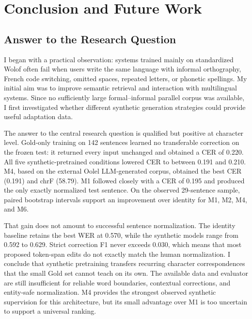 \documentclass[12pt, a4paper, twoside, openany]{report}
\begin{document}
\chapter{Conclusion and Future Work}
\label{chap:conclusion}

\section{Answer to the Research Question}

I began with a practical observation: systems trained mainly on standardized Wolof often fail when users write the same language with informal orthography, French code switching, omitted spaces, repeated letters, or phonetic spellings. My initial aim was to improve semantic retrieval and interaction with multilingual systems. Since no sufficiently large formal--informal parallel corpus was available, I first investigated whether different synthetic generation strategies could provide useful adaptation data.

The answer to the central research question is qualified but positive at character level. Gold-only training on 142 sentences learned no transferable correction on the frozen test: it returned every input unchanged and obtained a CER of 0.220. All five synthetic-pretrained conditions lowered CER to between 0.191 and 0.210. M4, based on the external Oolel LLM-generated corpus, obtained the best CER (0.191) and chrF (58.79). M1 followed closely with a CER of 0.195 and produced the only exactly normalized test sentence. On the observed 29-sentence sample, paired bootstrap intervals support an improvement over identity for M1, M2, M4, and M6.

That gain does not amount to successful sentence normalization. The identity baseline retains the best WER at 0.570, while the synthetic models range from 0.592 to 0.629. Strict correction F1 never exceeds 0.030, which means that most proposed token-span edits do not exactly match the human normalization. I conclude that synthetic pretraining transfers recurring character correspondences that the small Gold set cannot teach on its own. The available data and evaluator are still insufficient for reliable word boundaries, contextual corrections, and entity-safe normalization. M4 provides the strongest observed synthetic supervision for this architecture, but its small advantage over M1 is too uncertain to support a universal ranking.
\end{document}
